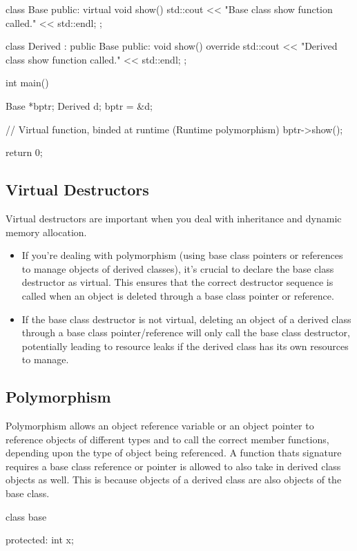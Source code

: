\documentclass{report}
\begin{document}
\begin{concept}
\begin{cppcode}
class Base {
public:
    virtual void show() {
        std::cout << "Base class show function called." << std::endl;
    }
};

class Derived : public Base {
public:
    void show() override {
        std::cout << "Derived class show function called." << std::endl;
    }
};

int main() {
    Base *bptr;
    Derived d;
    bptr = &d;

    // Virtual function, binded at runtime (Runtime polymorphism)
    bptr->show();

    return 0;
}
    \end{cppcode}


    \bigbreak \noindent 
    \subsection{Virtual Destructors}
    \bigbreak \noindent 
    \begin{concept}
        Virtual destructors are important when you deal with inheritance and dynamic memory allocation. 
        \begin{itemize}
            \item If you're dealing with polymorphism (using base class pointers or references to manage objects of derived classes), it's crucial to declare the base class destructor as virtual. This ensures that the correct destructor sequence is called when an object is deleted through a base class pointer or reference.
            \item If the base class destructor is not virtual, deleting an object of a derived class through a base class pointer/reference will only call the base class destructor, potentially leading to resource leaks if the derived class has its own resources to manage.
        \end{itemize}
    \end{concept}

    \pagebreak 
    \subsection{Polymorphism}
    \bigbreak \noindent 
    \begin{concept}
       Polymorphism allows an object reference variable or an object pointer to reference objects of different types and to call the correct member functions, depending upon the type of object being referenced. 
       \bigbreak \noindent 
       A function thats signature requires a base class reference or pointer is allowed to also take in derived class objects as well. This is because objects of a derived class are also objects of the base class.
    \end{concept}
    \bigbreak \noindent 
    \begin{cppcode}
        class base {
        protected:
            int x;

}
\end{cppcode}
\end{concept}
\end{document}
